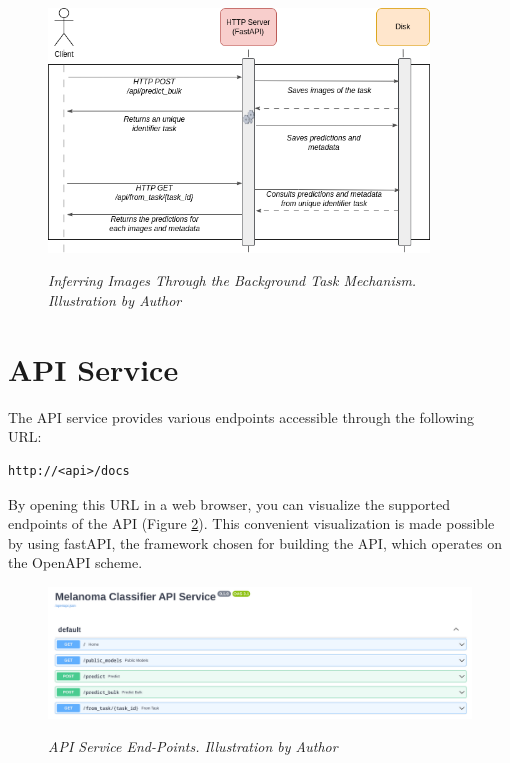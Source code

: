 \begin{figure}[H]
  \centering
  \includegraphics[width=0.9\textwidth]{imatges/preliminaries/BackgroundTask.drawio.png}
  \caption[Inferring Images Through the Background Task Mechanism]{\textit{Inferring Images Through the Background Task Mechanism.  Illustration by Author}}
  {\label{fig:backgrond-task}}
\end{figure}

\newpage

\section{API Service}

The API service provides various endpoints accessible through the following URL:

\begin{Verbatim}[fontsize=\scriptsize]
http://<api>/docs
\end{Verbatim}

By opening this URL in a web browser, you can visualize the supported endpoints of the API
(Figure \ref{fig:api-endpoints}). This convenient visualization is made possible by using fastAPI,
the framework chosen for building the API, which operates on the OpenAPI scheme.

\begin{figure}[H]
  \centering
  \begin{adjustbox}{width=\textwidth, trim={0.2cm 0cm 0.1cm 0cm}, clip}
    \includegraphics[width=\textwidth]{imatges/results/api-endpoints.png}
  \end{adjustbox}
  \caption[API Service End-Points]{\textit{API Service End-Points. Illustration by Author}}
  {\label{fig:api-endpoints}}
\end{figure}

